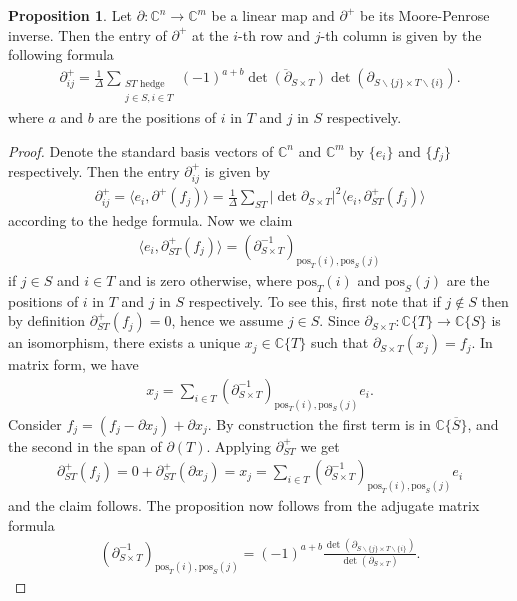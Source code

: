 \documentclass[11pt,reqno]{amsart}
\def\C {{\mathbb C}}
\theoremstyle{definition}
\newtheorem{proposition}[theorem]{Proposition}
\numberwithin{equation}{section}
\begin{document}
\begin{proposition}\label{prop:MP-inverse-entry}
    Let $\partial:\C^n\rightarrow\C^m$ be a linear map and $\partial^+$ be its Moore-Penrose inverse. Then the entry of $\partial^+$ at the $i$-th row and $j$-th column is given by the following formula
    \begin{align*}
        \partial^+_{ij} = \frac{1}{\Delta}\sum_{\substack{ ST \text{ hedge} \\ j\in S, i\in T}} (-1)^{a+b} \overline{\det(\partial_{S\times T})}\det(\partial_{S\backslash\{j\}\times T\backslash\{i\}}).
    \end{align*}
    where $a$ and $b$ are the positions of $i$ in $T$ and $j$ in $S$ respectively.
\end{proposition}
\begin{proof}
    Denote the standard basis vectors of $\C^n$ and $\C^m$ by $\{e_i\}$ and $\{f_j\}$ respectively. Then the entry $\partial^+_{ij}$ is given by
    \begin{align*}
        \partial^+_{ij} = \langle e_i, \partial^+(f_j) \rangle = \frac{1}{\Delta}\sum_{ST}|\det\partial_{S\times T}|^2 \langle e_i, \partial_{ST}^+(f_j) \rangle
    \end{align*}
    according to the hedge formula. Now we claim
    \begin{align*}
        \langle e_i, \partial_{ST}^+(f_j) \rangle = (\partial_{S\times T}^{-1})_{\mathrm{pos}_T(i),\mathrm{pos}_S(j)}
    \end{align*}
    if $j\in S$ and $i\in T$ and is zero otherwise, where $\mathrm{pos}_T(i)$ and $\mathrm{pos}_S(j)$ are the positions of $i$ in $T$ and $j$ in $S$ respectively. To see this, first note that if $j\not\in S$ then by definition $\partial_{ST}^+(f_j)=0$, hence we assume $j\in S$. Since $\partial_{S\times T}:\C\{T\}\rightarrow\C\{S\}$ is an isomorphism, there exists a unique $x_j\in \C\{T\}$ such that $\partial_{S\times T}(x_j)=f_j$. In matrix form, we have
    \begin{align*}
        x_j = \sum_{i\in T}(\partial_{S\times T}^{-1})_{\mathrm{pos}_T(i),\mathrm{pos}_S(j)} e_i.
    \end{align*}
    Consider $f_j = (f_j - \partial x_j) + \partial x_j$. By construction the first term is in $\C\{\overline{S}\}$, and the second in the span of $\partial(T)$. Applying $\partial_{ST}^{+}$ we get
    \begin{align*}
        \partial_{ST}^{+}(f_j) = 0 + \partial_{ST}^{+}(\partial x_j)= x_j = \sum_{i\in T}(\partial_{S\times T}^{-1})_{\mathrm{pos}_T(i),\mathrm{pos}_S(j)} e_i
    \end{align*}
    and the claim follows. The proposition now follows from the adjugate matrix formula
    \begin{align*}
        (\partial_{S\times T}^{-1})_{\mathrm{pos}_T(i),\mathrm{pos}_S(j)} = (-1)^{a+b} \frac{\det\left( \partial_{S\backslash\{j\} \times T\backslash\{i\}} \right)}{\det\left( \partial_{S\times T} \right)}.
    \end{align*}
\end{proof}
\end{document}
